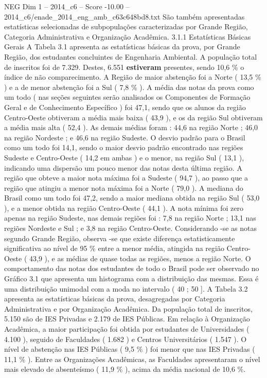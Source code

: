 \begin{textsample}{NEG Dim 1 – 2014\_c6 – Score -10.00 – 2014\_c6/enade\_2014\_eng\_amb\_c63c648bd8.txt}
São também apresentadas estatísticas selecionadas de subpopulações caracterizadas por Grande Região, Categoria Administrativa e Organização Acadêmica. 3.1.1 Estatísticas Básicas Gerais A Tabela 3.1 apresenta as estatísticas básicas da prova, por Grande Região, dos estudantes concluintes de Engenharia Ambiental.
A população total de inscritos foi de 7.329.
Destes, 6.551 \textbf{estiveram} presentes, sendo 10,6 \% o índice de não comparecimento.
A Região de maior abstenção foi a Norte ( 13,5 \% ) e a de menor abstenção foi a Sul ( 7,8 \% ).
A média das notas da prova como um todo ( nas seções seguintes serão analisados os Componentes de Formação Geral e de Conhecimento Específico ) foi 47,1, sendo que os alunos da região Centro-Oeste obtiveram a média mais baixa ( 43,9 ), e os da região Sul obtiveram a média mais alta ( 52,4 ).
As demais médias foram : 44,6 na região Norte ; 46,0 na região Nordeste ; e 46,6 na região Sudeste.
O desvio padrão para o Brasil como um todo foi 14,1, sendo o maior desvio padrão encontrado nas regiões Sudeste e Centro-Oeste ( 14,2 em ambas ) e o menor, na região Sul ( 13,1 ), indicando uma dispersão um pouco menor das notas desta última região.
A região que obteve a maior nota máxima foi a Sudeste ( 94,7 ), ao passo que a região que atingiu a menor nota máxima foi a Norte ( 79,0 ).
A mediana do Brasil como um todo foi 47,2, sendo a maior mediana obtida na região Sul ( 53,0 ), e a menor obtida na região Centro-Oeste ( 44,1 ).
A nota mínima foi zero apenas na região Sudeste, nas demais regiões foi : 7,8 na região Norte ; 13,1 nas regiões Nordeste e Sul ; e 3,8 na região Centro-Oeste.
Considerando -se as notas segundo Grande Região, observa -se que existe diferença estatisticamente significativa ao nível de 95 \% entre a menor média, atingida na região Centro-Oeste ( 43,9 ), e as médias de quase todas as regiões, menos a região Norte.
O comportamento das notas dos estudantes de todo o Brasil pode ser observado no Gráfico 3.1 que apresenta um histograma com a distribuição das mesmas.
Essa é uma distribuição unimodal com a moda no intervalo ( 40 ; 50 ].
A Tabela 3.2 apresenta as estatísticas básicas da prova, desagregadas por Categoria Administrativa e por Organização Acadêmica.
Da população total de inscritos, 5.150 são de IES Privadas e 2.179 de IES Públicas.
Em relação à Organização Acadêmica, a maior participação foi obtida por estudantes de Universidades ( 4.100 ), seguido de Faculdades ( 1.682 ) e Centros Universitários ( 1.547 ).
O nível de abstenção nas IES Públicas ( 9,5 \% ) foi menor que nas IES Privadas ( 11,1 \% ).
Entre as Organizações Acadêmicas, as Faculdades apresentaram o nível mais elevado de absenteísmo ( 11,9 \% ), acima da média nacional de 10,6 \%.

\end{textsample}
